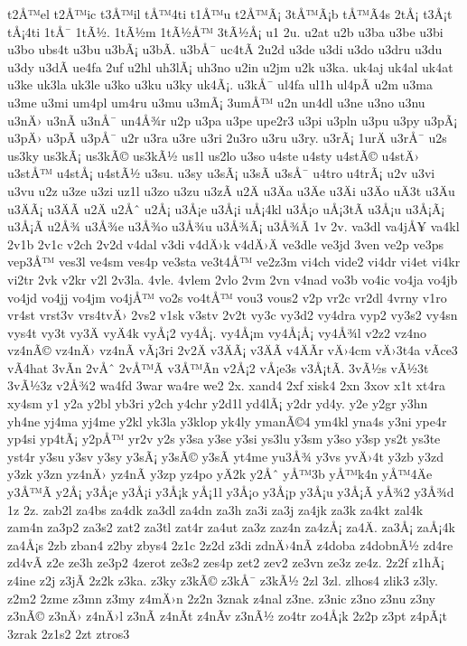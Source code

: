 {t2Å™el
t2Å™ic
t3Å™il
tÅ™4ti
t1Å™u
t2Å™Ã¡
3tÅ™Ã¡b
tÅ™Ã­4s
2tÅ¡
t3Å¡t
tÅ¡4ti
1tÅ¯
1tÃ½.
1tÃ½m
1tÃ½Å™
3tÃ½Å¡
u1
2u.
u2at
u2b
u3ba
u3be
u3bi
u3bo
ubs4t
u3bu
u3bÃ¡
u3bÃ­.
u3bÅ¯
uc4tÃ­
2u2d
u3de
u3di
u3do
u3dru
u3du
u3dy
u3dÃ­
ue4fa
2uf
u2hl
uh3lÃ¡
uh3no
u2in
u2jm
u2k
u3ka.
uk4aj
uk4al
uk4at
u3ke
uk3la
uk3le
u3ko
u3ku
u3ky
uk4Ã¡.
u3kÅ¯
ul4fa
ul1h
ul4pÃ­
u2m
u3ma
u3me
u3mi
um4pl
um4ru
u3mu
u3mÃ¡
3umÅ™
u2n
un4dl
u3ne
u3no
u3nu
u3nÄ›
u3nÃ­
u3nÅ¯
un4Å¾r
u2p
u3pa
u3pe
upe2r3
u3pi
u3pln
u3pu
u3py
u3pÃ¡
u3pÄ›
u3pÃ­
u3pÅ¯
u2r
u3ra
u3re
u3ri
2u3ro
u3ru
u3ry.
u3rÃ¡
1urÄ
u3rÅ¯
u2s
us3ky
us3kÃ¡
us3kÃ©
us3kÃ½
us1l
us2lo
u3so
u4ste
u4sty
u4stÃ©
u4stÄ›
u3stÅ™
u4stÅ¡
u4stÃ½
u3su.
u3sy
u3sÃ¡
u3sÃ­
u3sÅ¯
u4tro
u4trÃ¡
u2v
u3vi
u3vu
u2z
u3ze
u3zi
uz1l
u3zo
u3zu
u3zÃ­
u2Ä
u3Äa
u3Äe
u3Äi
u3Äo
uÄ3t
u3Äu
u3ÄÃ¡
u3ÄÃ­
u2Ä
u2Åˆ
u2Å¡
u3Å¡e
u3Å¡i
uÅ¡4kl
u3Å¡o
uÅ¡3tÃ­
u3Å¡u
u3Å¡Ã¡
u3Å¡Ã­
u2Å¾
u3Å¾e
u3Å¾o
u3Å¾u
u3Å¾Ã¡
u3Å¾Ã­
1v
2v.
va3dl
va4jÅ¥
va4kl
2v1b
2v1c
v2ch
2v2d
v4dal
v3di
v4dÄ›k
v4dÄ›Ä
ve3dle
ve3jd
3ven
ve2p
ve3ps
vep3Å™
ves3l
ve4sm
ves4p
ve3sta
ve3t4Å™
ve2z3m
vi4ch
vide2
vi4dr
vi4et
vi4kr
vi2tr
2vk
v2kr
v2l
2v3la.
4vle.
4vlem
2vlo
2vm
2vn
v4nad
vo3b
vo4ic
vo4ja
vo4jb
vo4jd
vo4jj
vo4jm
vo4jÅ™
vo2s
vo4tÅ™
vou3
vous2
v2p
vr2c
vr2dl
4vrny
v1ro
vr4st
vrst3v
vrs4tvÄ›
2vs2
v1sk
v3stv
2v2t
vy3c
vy3d2
vy4dra
vyp2
vy3s2
vy4sn
vys4t
vy3t
vy3Ä
vyÄ4k
vyÅ¡2
vy4Å¡.
vy4Å¡m
vy4Å¡Å¡
vy4Å¾l
v2z2
vz4no
vz4nÃ©
vz4nÄ›
vz4nÃ­
vÃ¡3ri
2v2Ä
v3ÄÃ¡
v3ÄÃ­
v4ÄÃ­r
vÄ›4cm
vÄ›3t4a
vÃ­ce3
vÃ­4hat
3vÃ­n
2vÅˆ
2vÅ™Ã­
v3Å™Ã­n
v2Å¡2
vÅ¡e3s
v3Å¡tÃ­.
3vÃ½s
vÃ½3t
3vÃ½3z
v2Å¾2
wa4fd
3war
wa4re
we2
2x.
xand4
2xf
xisk4
2xn
3xov
x1t
xt4ra
xy4sm
y1
y2a
y2bl
yb3ri
y2ch
y4chr
y2d1l
yd4lÃ¡
y2dr
yd4y.
y2e
y2gr
y3hn
yh4ne
yj4ma
yj4me
y2kl
yk3la
y3klop
yk4ly
ymanÃ©4
ym4kl
yna4s
y3ni
ype4r
yp4si
yp4tÃ¡
y2pÅ™
yr2v
y2s
y3sa
y3se
y3si
ys3lu
y3sm
y3so
y3sp
ys2t
ys3te
yst4r
y3su
y3sv
y3sy
y3sÃ¡
y3sÃ©
y3sÃ­
yt4me
yu3Å¾
y3vs
yvÄ›4t
y3zb
y3zd
y3zk
y3zn
yz4nÄ›
yz4nÃ­
y3zp
yz4po
yÄ2k
y2Åˆ
yÅ™3b
yÅ™k4n
yÅ™4Äe
y3Å™Ã­
y2Å¡
y3Å¡e
y3Å¡i
y3Å¡k
yÅ¡1l
y3Å¡o
y3Å¡p
y3Å¡u
y3Å¡Ã­
yÅ¾2
y3Å¾d
1z
2z.
zab2l
za4bs
za4dk
za3dl
za4dn
za3h
za3i
za3j
za4jk
za3k
za4kt
zal4k
zam4n
za3p2
za3s2
zat2
za3tl
zat4r
za4ut
za3z
zaz4n
za4zÅ¡
za4Ä.
za3Å¡
zaÅ¡4k
za4Å¡s
2zb
zban4
z2by
zbys4
2z1c
2z2d
z3di
zdnÄ›4nÃ­
z4doba
z4dobnÃ½
zd4re
zd4vÃ­
z2e
ze3h
ze3p2
4zerot
ze3s2
zes4p
zet2
zev2
ze3vn
ze3z
ze4z.
2z2f
z1hÃ¡
z4ine
z2j
z3jÃ­
2z2k
z3ka.
z3ky
z3kÃ©
z3kÅ¯
z3kÃ½
2zl
3zl.
zlhos4
zlik3
z3ly.
z2m2
2zme
z3mn
z3my
z4mÄ›n
2z2n
3znak
z4nal
z3ne.
z3nic
z3no
z3nu
z3ny
z3nÃ©
z3nÄ›
z4nÄ›l
z3nÃ­
z4nÃ­t
z4nÃ­v
z3nÃ½
zo4tr
zo4Å¡k
2z2p
z3pt
z4pÃ¡t
3zrak
2z1s2
2zt
ztros3
}
